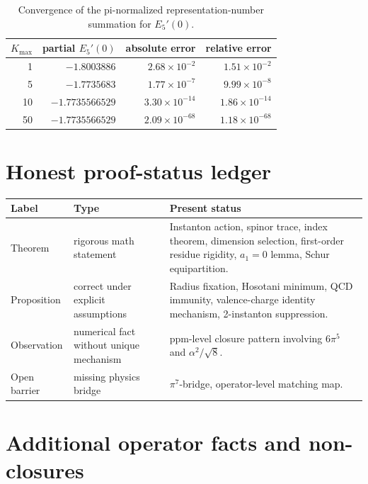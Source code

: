 \documentclass[11pt,a4paper]{article}
\begin{document}
\begin{table}[h!]
\centering
\renewcommand{\arraystretch}{1.15}
\begin{tabular}{rrrr}
\toprule
$K_{\max}$ & partial $E_5'(0)$ & absolute error & relative error\\
\midrule
1 & $-1.8003886$ & $2.68\times10^{-2}$ & $1.51\times10^{-2}$\\
5 & $-1.7735683$ & $1.77\times10^{-7}$ & $9.99\times10^{-8}$\\
10 & $-1.7735566529$ & $3.30\times10^{-14}$ & $1.86\times10^{-14}$\\
50 & $-1.7735566529$ & $2.09\times10^{-68}$ & $1.18\times10^{-68}$\\
\bottomrule
\end{tabular}
\caption{Convergence of the pi-normalized representation-number summation for $E_5'(0)$.}
\end{table}

\section{Honest proof-status ledger}
\begin{center}
\renewcommand{\arraystretch}{1.2}
\begin{tabular}{p{}p{}p{}}
\toprule
Label & Type & Present status\\
\midrule
Theorem & rigorous math statement
  & Instanton action, spinor trace, index theorem, dimension selection,
    first-order residue rigidity, $a_1=0$ lemma, Schur equipartition.\\
Proposition & correct under explicit assumptions
  & Radius fixation, Hosotani minimum, QCD immunity, valence-charge identity
    mechanism, 2-instanton suppression.\\
Observation & numerical fact without unique mechanism
  & ppm-level closure pattern involving $6\pi^5$ and $\alpha^2/\sqrt{8}$.\\
Open barrier & missing physics bridge
  & $\pi^7$-bridge, operator-level matching map.\\
\bottomrule
\end{tabular}
\end{center}

\section{Additional operator facts and non-closures}
\end{document}
